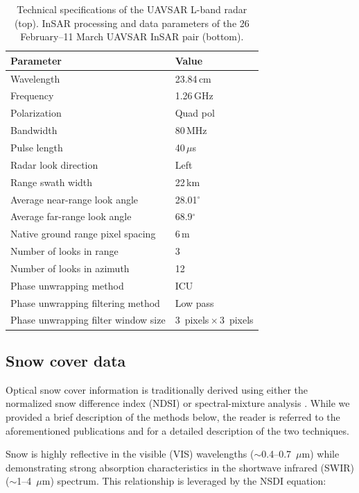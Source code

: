 \begin{table}[t]
\centering
\caption{Technical specifications of the UAVSAR L-band radar (top). InSAR processing and data parameters of the 26 February--11 March UAVSAR InSAR pair (bottom).}
\begin{tabular}{ll}
\toprule Parameter & Value \\
\midrule
Wavelength & 23.84\,cm \\
Frequency & 1.26\,GHz \\
Polarization & Quad pol \\
Bandwidth & 80\,MHz \\
Pulse length & 40\,$\mu$s \\
Radar look direction & Left \\
Range swath width & 22\,km \\
Average near-range look angle & 28.01$^{\circ}$\\
Average far-range look angle & 68.9$^{\circ}$\\
\midrule
Native ground range pixel spacing & 6\,m \\
Number of looks in range & 3 \\
Number of looks in azimuth & 12 \\
Phase unwrapping method & ICU \\
Phase unwrapping filtering method & Low pass \\
Phase unwrapping filter window size & 3~pixels\,$\times$\,3~pixels \\
\bottomrule
\end{tabular}
\end{table}


\hypertarget{ch4-methods-2}{\subsection{Snow cover data}\label{ch4-methods-2}}

Optical snow cover information is traditionally derived using either the normalized snow difference index (NDSI) \citep{dozierSpectralSignatureAlpine1989} or spectral-mixture analysis \citep{rosenthalAutomatedMappingMontane1996,nolinMappingAlpineSnow1993}. While we provided a brief description of the methods below, the reader is referred to the aforementioned publications and \cite{stillingerLandsatMODISVIIRS2023} for a detailed description of the two techniques.

Snow is highly reflective in the visible (VIS) wavelengths ($\sim$0.4--0.7~$\mu$m) while demonstrating strong absorption characteristics in the shortwave infrared (SWIR) ($\sim$1--4~$\mu$m) spectrum. This relationship is leveraged by the NSDI equation:

